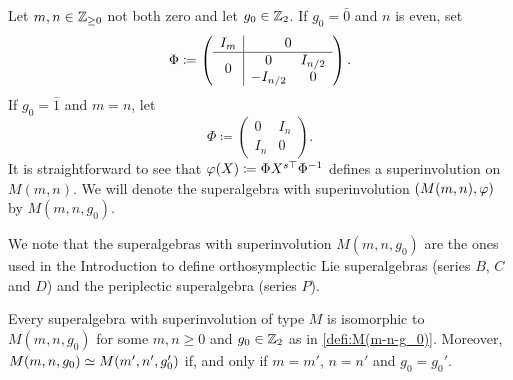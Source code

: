 \begin{defi}\label{defi:M(m-n-g_0)}
    Let $m,n \in \mathbb{Z}_{\geq 0}$ not both zero and let $g_0 \in \mathbb{Z}_2$. 
    If $g_0 = \bar 0$ and $n$ is even, set 
    \[
        \sbox0{$\begin{matrix} 0& I_{n/2}\\ -I_{n/2}& 0\end{matrix}$}
        \Phi \coloneqq \left(\begin{array}{c|c}
                    I_m & 0\\
                    \hline
                    0 & \usebox{0}
                \end{array}\right).
    \]
    If $g_0 = \bar 1$ and $m = n$, let
    \[
        \Phi \coloneqq \left(\begin{array}{c|c}
                    0 & I_n\\
                    \hline 
                    I_n & 0
                \end{array}\right).
    \]
    It is straightforward to see that $\varphi(X) \coloneqq \Phi X^{s\top} \Phi^{-1}$ defines a superinvolution on $M(m,n)$. 
    We will denote the superalgebra with superinvolution $(M(m,n), \varphi)$ by $M(m,n, g_0)$. 
\end{defi}

We note that the superalgebras with superinvolution $M(m,n,g_0)$ are the ones used in the Introduction to define orthosymplectic Lie superalgebras (series $B$, $C$ and $D$) and the periplectic superalgebra (series $P$).

\begin{prop}\label{prop:iso-M-with-vphi}
    Every superalgebra with superinvolution of type $M$ is isomorphic to $M(m,n, g_0)$ for some $m,n \geq 0$ and $g_0 \in \mathbb{Z}_2$ as in \cref{defi:M(m-n-g_0)}. 
    Moreover, $M(m,n, g_0) \simeq M(m',n', g_0')$ if, and only if $m = m'$, $n = n'$ and $g_0 = g_0'$.
\end{prop}

